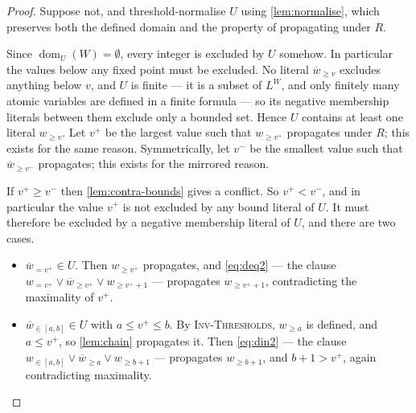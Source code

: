 \documentclass[11pt,a4paper]{article}
\theoremstyle{plain}
\theoremstyle{definition}
\theoremstyle{remark}
\newcommand{\fname}[1]{\ensuremath{\operatorname{#1}}}
\newcommand{\dm}{\fname{dom}}
\newcommand{\atge}[2]{#1_{\geq #2}}
\newcommand{\ateq}[2]{#1_{= #2}}
\newcommand{\atin}[3]{#1_{\in[#2,#3]}}
\newcommand{\natge}[2]{\overline{#1}_{\geq #2}}
\newcommand{\nateq}[2]{\overline{#1}_{= #2}}
\newcommand{\natin}[3]{\overline{#1}_{\in[#2,#3]}}
\newcommand{\inv}[1]{\textnormal{\textsc{Inv-#1}}}
\newcommand{\invThresholds}{\inv{Thresholds}}
\begin{document}
\begin{proof}
Suppose not, and threshold-normalise $U$ using \cref{lem:normalise}, which preserves
both the defined domain and the property of propagating under $R$.

Since $\dm_U(W)=\emptyset$, every integer is excluded by $U$ somehow.  In
particular the values below any fixed point must be excluded.  No literal
$\natge{w}{v}$ excludes anything below $v$, and $U$ is finite --- it is a subset
of $L^W$, and only finitely many atomic variables are defined in a finite
formula --- so its negative membership literals between them exclude only a bounded
set.  Hence $U$ contains at least one literal $\atge{w}{v}$.  Let $v^{+}$ be the
largest value such that $\atge{w}{v^{+}}$ propagates under $R$; this exists for
the same reason.
Symmetrically, let $v^{-}$ be the smallest value such that
$\natge{w}{v^{-}}$ propagates; this exists for the mirrored reason.

If $v^{+}\geq v^{-}$ then \cref{lem:contra-bounds} gives a conflict.  So
$v^{+}<v^{-}$, and in particular the value $v^{+}$ is not excluded by any bound
literal of $U$.  It must therefore be excluded by a negative membership literal of
$U$, and there are two cases.
\begin{itemize}[itemsep=1pt]
  \item $\nateq{w}{v^{+}}\in U$.  Then $\atge{w}{v^{+}}$ propagates,
    and \cref{eq:deq2} --- the clause
    $\ateq{w}{v^{+}}\vee\natge{w}{v^{+}}\vee\atge{w}{v^{+}+1}$ ---
    propagates $\atge{w}{v^{+}+1}$, contradicting the maximality of $v^{+}$.
  \item $\natin{w}{a}{b}\in U$ with $a\leq v^{+}\leq b$.  By
    \invThresholds{}, $\atge{w}{a}$ is defined, and $a\leq v^{+}$, so
    \cref{lem:chain} propagates it.  Then \cref{eq:din2} --- the clause
    $\atin{w}{a}{b}\vee\natge{w}{a}\vee\atge{w}{b+1}$ --- propagates
    $\atge{w}{b+1}$, and $b+1>v^{+}$, again contradicting maximality.
    \qedhere
\end{itemize}
\end{proof}
\end{document}
